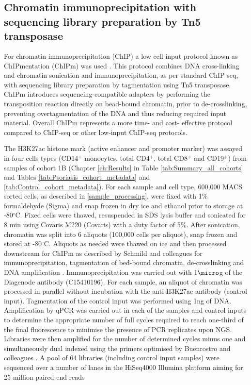 \subsection{Chromatin immunoprecipitation with sequencing library preparation by Tn5 transposase}
For chromatin immunoprecipitation (ChIP) a low cell input protocol known as ChIPmentation (ChIPm) was used \parencite{Schmidl2015}. This protocol combines DNA cross-linking and chromatin sonication and immunoprecipitation, as per standard ChIP-seq, with sequencing library preparation by tagmentation using Tn5 transposase. ChIPm introduces sequencing-compatible adapters by performing the transposition reaction directly on bead-bound chromatin, prior to de-crosslinking, preventing overtagmentation of the DNA and thus reducing required input material. Overall ChIPm represents a more time- and cost- effective protocol compared to ChIP-seq or other low-input ChIP-seq protocols. 

The H3K27ac histone mark (active enhancer and promoter marker) was assayed in four cells types (CD14$^+$ monocytes, total CD4$^+$, total CD8$^+$ and CD19$^+$) from samples of cohort 1B (Chapter \ref{ch:Results} in Table \ref{tab:Summary_all_cohorts} and Tables \ref{tab:Psoriasis_cohort_metadata} and \ref{tab:Control_cohort_metadata}). For each sample and cell type, 600,000 MACS sorted cells, as described in \ref{sample_processing}, were fixed with 1\% formaldehyde (Sigma) and snap frozen in dry ice and ethanol prior to storage at -80{$^\circ$}C. Fixed cells were thawed, resuspended in SDS lysis buffer and sonicated for 8 min using Covaris M220 (Covaris) with a duty factor of 5\%. After sonication, chromatin was split into 6 aliquots (100,000 cells per aliquot), snap frozen and stored at -80{$^\circ$}C. Aliquots as needed were thawed on ice and then processed downstream for ChIPm as described by Schmild and colleagues for immunoprecipitation, tagmentation of bed-bound chromatin, de-crosslinking and DNA amplification \parencite{Schmidl2015}. Immunoprecipitation was carried out with 1$\micro$g of the Diagenode antibody (C15410196). For each sample, an aliquot of chromatin was processed in parallel without incubation with the anti-H3K27ac antibody (control input). Tagmentation of the control input was performed using 1ng of DNA. Amplification by qPCR was carried out in each of the samples and control inputs to determine the appropriate number of full cycles required to reach one-third of the final fluorescence to minimise the presence of PCR replicates upon NGS. Libraries were then amplified for the number of determined cycles minus one and simultaneously dual indexed using the primers optimised by Buenrostro and colleagues \parencite{Buenrostro2015}. A pool of 64 libraries (including control input samples) were sequenced over a number of lanes in the HiSeq4000 Illumina platform aiming for 25 million paired-end reads



